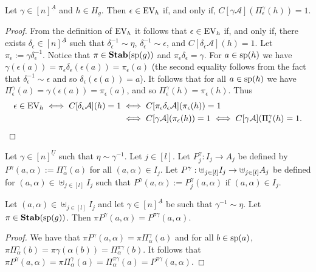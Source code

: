 \documentclass[../main/thesis.tex]{subfiles}
\begin{document}
\begin{lem}
	Let $\gamma\in [n]^{\underline{A}}$ and $h \in H_g$. Then $\epsilon \in \text{EV}_h$
  if, and only if, $C[\gamma \mathcal{A}](\Pi^{\gamma}_{\epsilon} (h)) = 1$.
  \label{lem:translate-EV-circuits}
\end{lem}
\begin{proof}
  From the definition of $\text{EV}_h$ it follows that $\epsilon \in \text{EV}_h$ if, and
  only if, there exists $\delta_{\epsilon} \in [n]^{\underline{A}}$ such that
  $\delta^{-1}_{\epsilon} \sim \eta$, $\delta^{-1}_{\epsilon} \sim \epsilon$,
  and $C[\delta_{\epsilon} \mathcal{A}](h) = 1$. Let $\pi_{\epsilon} := \gamma
  \delta^{-1}_{\epsilon}$. Notice that $\pi \in \text{\textbf{Stab}} (\text{sp} (g))$ and $\pi_{\epsilon}
  \delta_{\epsilon} = \gamma$. For $a \in \text{sp}(h)$ we have $\gamma
  (\epsilon(a)) = \pi_{\epsilon} \delta_{\epsilon} (\epsilon (a)) =
  \pi_{\epsilon}(a)$ (the second equality follows from the fact that
  $\delta^{-1}_{\epsilon} \sim \epsilon$ and so $\delta_{\epsilon} (\epsilon
  (a)) = a$). It follows that for all $a \in \text{sp}(h)$ we have
  $\Pi^{\gamma}_\epsilon (a) = \gamma (\epsilon (a)) = \pi_{\epsilon}(a)$, and
  so $\Pi^{\gamma}_{\epsilon}(h) = \pi_{\epsilon}(h)$. Thus
  \begin{align*}
    \epsilon \in \text{EV}_h \iff C[\delta_{\epsilon} \mathcal{A}](h) = 1 
    & \iff C[\pi_\epsilon \delta_{\epsilon} \mathcal{A}](\pi_{\epsilon} (h)) = 1 \\
    & \iff C[\gamma \mathcal{A}](\pi_{\epsilon} (h)) = 1 
      \iff C[\gamma \mathcal{A}](\Pi^{\gamma}_{\epsilon}(h) = 1.
  \end{align*}
  
\end{proof}

Let $\gamma \in [n]^{\underline{U}}$ such that $\eta \sim \gamma^{-1}$. Let $j
\in [l]$. Let $P^{\gamma}_j: I_j \rightarrow A_j$ be defined by $P^{\gamma} (a,
\alpha) := \Pi^{\gamma}_{\alpha}(a)$ for all $(a, \alpha) \in I_j$. Let
$P^{\gamma} : \uplus_{j \in [l]} I_j \rightarrow \uplus_{j \in [l]}A_j$ be defined for
$(a, \alpha) \in \uplus_{j \in [l]} I_j$ such that $P^{\gamma}(a, \alpha) :=
P^{\gamma}_j (a, \alpha)$ if $(a, \alpha) \in I_j$.

\begin{lem}
  \label{lem:permuting projections}
  Let $(a, \alpha) \in \uplus_{j \in [l]} I_j$ and let $\gamma \in
  [n]^{\underline{A}}$ be such that $\gamma^{-1} \sim \eta$. Let $\pi \in
  \text{\textbf{Stab}} (\text{sp} (g))$. Then $\pi P^{\gamma}(a, \alpha) = P^{\pi \gamma}(a, \alpha)$.
\end{lem}
\begin{proof}
	We have that $\pi P^{\gamma}(a, \alpha) = \pi \Pi^{\gamma}_{\alpha}(a)$ and
  for all $b \in \text{sp}(a)$, $\pi \Pi^{\gamma}_{\alpha}(b) = \pi \gamma
  (\alpha(b)) = \Pi^{\pi \gamma}_{\alpha}(b)$. It follows that $\pi
  P^{\gamma}(a, \alpha) = \pi \Pi^{\gamma}_{\alpha}(a) = \Pi^{\pi
    \gamma}_{\alpha}(a) = P^{\pi \gamma}(a, \alpha)$.
\end{proof}
\end{document}

